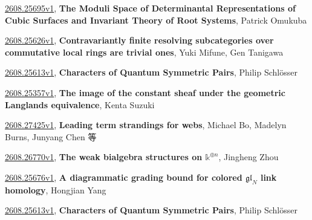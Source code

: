 \documentclass[9pt, a4paper]{article}
\theoremstyle{plain}
\theoremstyle{definition}
\theoremstyle{remark}
\newcommand{\arxiv}[3]{\href{https://arxiv.org/abs/#1}{#1}, \textbf{\textcolor{arxivblue}{#2}}, #3}
\begin{document}
\arxiv{2608.25695v1}{The Moduli Space of Determinantal Representations of Cubic Surfaces and Invariant Theory of Root Systems}{Patrick Omukuba}

\arxiv{2608.25626v1}{Contravariantly finite resolving subcategories over commutative local rings are trivial ones}{Yuki Mifune, Gen Tanigawa}

\arxiv{2608.25613v1}{Characters of Quantum Symmetric Pairs}{Philip Schlösser}

\arxiv{2608.25357v1}{The image of the constant sheaf under the geometric Langlands equivalence}{Kenta Suzuki}

\arxiv{2608.27425v1}{Leading term strandings for webs}{Michael Bo, Madelyn Burns, Junyang Chen 等}

\arxiv{2608.26770v1}{The weak bialgebra structures on $\mathbb{k}^{\oplus n}$}{Jingheng Zhou}

\arxiv{2608.25676v1}{A diagrammatic grading bound for colored $\mathfrak{gl}_N$ link homology}{Hongjian Yang}

\arxiv{2608.25613v1}{Characters of Quantum Symmetric Pairs}{Philip Schlösser}

\end{document}
